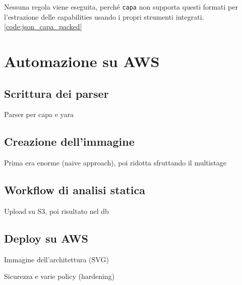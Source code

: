 Nessuna regola viene eseguita, perché \texttt{capa} non supporta questi formati per l'estrazione delle capabilities usando i propri strumenti integrati. \ref{code:json_capa_packed}

\section{Automazione su AWS}
\subsection{Scrittura dei parser}
Parser per capa e yara

\subsection{Creazione dell'immagine}
Prima era enorme (naive approach), poi ridotta sfruttando il multistage

\subsection{Workflow di analisi statica}
Upload su S3, poi risultato nel db

\subsection{Deploy su AWS}
Immagine dell'architettura (SVG)

Sicurezza e varie policy (hardening)